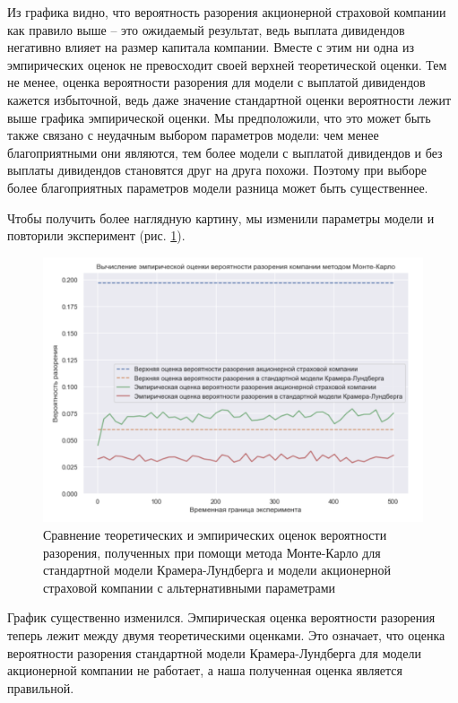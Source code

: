 \documentclass{article}
\theoremstyle{plain}
\theoremstyle{plain}
\theoremstyle{plain}
\theoremstyle{plain}
\theoremstyle{definition}
\theoremstyle{remark}
\begin{document}
Из графика видно, что вероятность разорения акционерной страховой компании как правило выше -- это ожидаемый результат, ведь выплата дивидендов негативно влияет на размер капитала компании. Вместе с этим ни одна из эмпирических оценок не превосходит своей верхней теоретической оценки. Тем не менее, оценка вероятности разорения для модели с выплатой дивидендов кажется избыточной, ведь даже значение стандартной оценки вероятности лежит выше графика эмпирической оценки. Мы предположили, что это может быть также связано с неудачным выбором параметров модели: чем менее благоприятными они являются, тем более модели с выплатой дивидендов и без выплаты дивидендов становятся друг на друга похожи. Поэтому при выборе более благоприятных параметров модели разница может быть существеннее.

Чтобы получить более наглядную картину, мы изменили параметры модели и повторили эксперимент (рис. \ref{MC_2}).

\begin{figure}[h]
\centering
\includegraphics[scale=0.7]{images/KL_stock_MC_2.png}
\captionsetup{justification=centering}
\caption{Сравнение теоретических и эмпирических оценок вероятности разорения, полученных при помощи метода Монте-Карло для стандартной модели Крамера-Лундберга и модели акционерной страховой компании с альтернативными параметрами}
\label{MC_2}
\end{figure}

График существенно изменился. Эмпирическая оценка вероятности разорения теперь лежит между двумя теоретическими оценками. Это означает, что оценка вероятности разорения стандартной модели Крамера-Лундберга для модели акционерной компании не работает, а наша полученная оценка является правильной.
\end{document}
